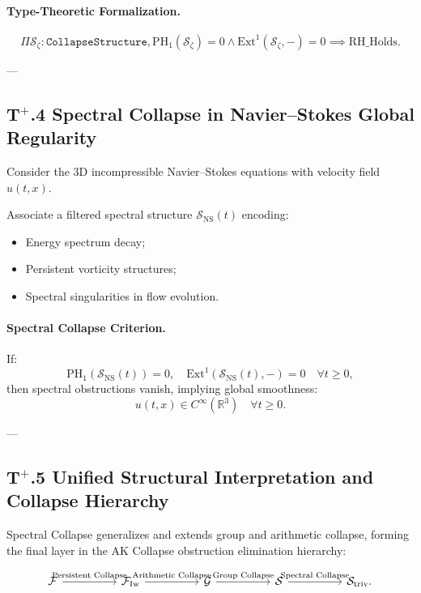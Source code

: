 \documentclass[11pt]{article}
\begin{document}
\paragraph{Type-Theoretic Formalization.}
\[
\Pi \mathcal{S}_{\zeta} : \texttt{CollapseStructure},
\mathrm{PH}_1(\mathcal{S}_{\zeta}) = 0 \wedge \mathrm{Ext}^1(\mathcal{S}_{\zeta}, -) = 0 \implies \mathrm{RH\_Holds}.
\]

---

\subsection*{T$^{+}$.4 Spectral Collapse in Navier--Stokes Global Regularity}

Consider the 3D incompressible Navier--Stokes equations with velocity field $u(t, x)$.

Associate a filtered spectral structure $\mathcal{S}_{\mathrm{NS}}(t)$ encoding:
\begin{itemize}
    \item Energy spectrum decay;
    \item Persistent vorticity structures;
    \item Spectral singularities in flow evolution.
\end{itemize}

\paragraph{Spectral Collapse Criterion.}
If:
\[
\mathrm{PH}_1(\mathcal{S}_{\mathrm{NS}}(t)) = 0, \quad \mathrm{Ext}^1(\mathcal{S}_{\mathrm{NS}}(t), -) = 0 \quad \forall t \geq 0,
\]
then spectral obstructions vanish, implying global smoothness:
\[
 u(t, x) \in C^{\infty}(\mathbb{R}^3) \quad \forall t \geq 0.
\]

---

\subsection*{T$^{+}$.5 Unified Structural Interpretation and Collapse Hierarchy}

Spectral Collapse generalizes and extends group and arithmetic collapse, forming the final layer in the AK Collapse obstruction elimination hierarchy:

\[
\begin{tikzcd}[column sep=huge]
\mathcal{F} \arrow[r, "\text{Persistent Collapse}"]
& \mathcal{F}_{\mathrm{Iw}} \arrow[r, "\text{Arithmetic Collapse}"]
& \mathcal{G} \arrow[r, "\text{Group Collapse}"]
& \mathcal{S} \arrow[r, "\text{Spectral Collapse}"]
& \mathcal{S}_{\mathrm{triv}}.
\end{tikzcd}
\]
\end{document}
